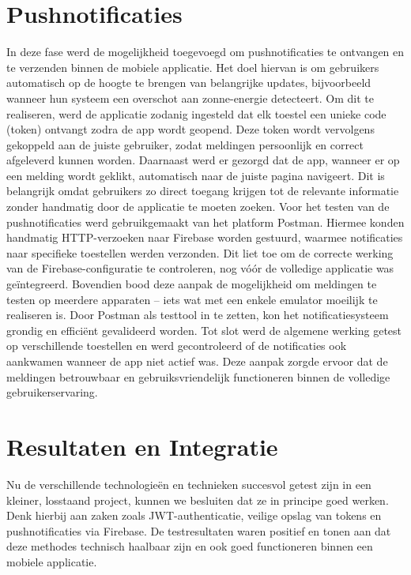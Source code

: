 \section{Pushnotificaties}

In deze fase werd de mogelijkheid toegevoegd om pushnotificaties te ontvangen en te verzenden binnen de mobiele applicatie. Het doel hiervan is om gebruikers automatisch op de hoogte te brengen van belangrijke updates, bijvoorbeeld wanneer hun systeem een overschot aan zonne-energie detecteert. Om dit te realiseren, werd de applicatie zodanig ingesteld dat elk toestel een unieke code (token) ontvangt zodra de app wordt geopend. Deze token wordt vervolgens gekoppeld aan de juiste gebruiker, zodat meldingen persoonlijk en correct afgeleverd kunnen worden.
Daarnaast werd er gezorgd dat de app, wanneer er op een melding wordt geklikt, automatisch naar de juiste pagina navigeert. Dit is belangrijk omdat gebruikers zo direct toegang krijgen tot de relevante informatie zonder handmatig door de applicatie te moeten zoeken.
Voor het testen van de pushnotificaties werd gebruikgemaakt van het platform Postman. Hiermee konden handmatig HTTP-verzoeken naar Firebase worden gestuurd, waarmee notificaties naar specifieke toestellen werden verzonden. Dit liet toe om de correcte werking van de Firebase-configuratie te controleren, nog vóór de volledige applicatie was geïntegreerd. Bovendien bood deze aanpak de mogelijkheid om meldingen te testen op meerdere apparaten – iets wat met een enkele emulator moeilijk te realiseren is. Door Postman als testtool in te zetten, kon het notificatiesysteem grondig en efficiënt gevalideerd worden.
Tot slot werd de algemene werking getest op verschillende toestellen en werd gecontroleerd of de notificaties ook aankwamen wanneer de app niet actief was. Deze aanpak zorgde ervoor dat de meldingen betrouwbaar en gebruiksvriendelijk functioneren binnen de volledige gebruikerservaring.


\section{Resultaten en Integratie}

Nu de verschillende technologieën en technieken succesvol getest zijn in een kleiner, losstaand project, kunnen we besluiten dat ze in principe goed werken. Denk hierbij aan zaken zoals JWT-authenticatie, veilige opslag van tokens en pushnotificaties via Firebase. De testresultaten waren positief en tonen aan dat deze methodes technisch haalbaar zijn en ook goed functioneren binnen een mobiele applicatie.

